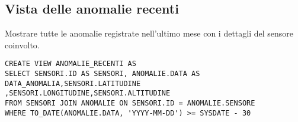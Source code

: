 \subsection{Vista delle anomalie recenti}
Mostrare tutte le anomalie registrate nell’ultimo mese con i dettagli del sensore coinvolto.
\begin{verbatim}
CREATE VIEW ANOMALIE_RECENTI AS
SELECT SENSORI.ID AS SENSORI, ANOMALIE.DATA AS DATA_ANOMALIA,SENSORI.LATITUDINE ,SENSORI.LONGITUDINE,SENSORI.ALTITUDINE
FROM SENSORI JOIN ANOMALIE ON SENSORI.ID = ANOMALIE.SENSORE
WHERE TO_DATE(ANOMALIE.DATA, 'YYYY-MM-DD') >= SYSDATE - 30
\end{verbatim}

